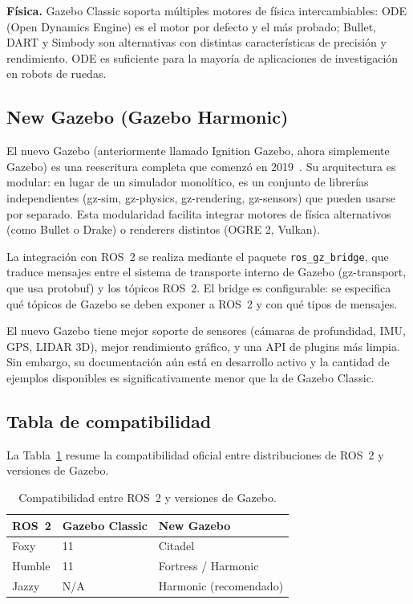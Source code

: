 \textbf{Física.} Gazebo Classic soporta múltiples motores de física intercambiables: ODE (Open Dynamics Engine) es el motor por defecto y el más probado; Bullet, DART y Simbody son alternativas con distintas características de precisión y rendimiento. ODE es suficiente para la mayoría de aplicaciones de investigación en robots de ruedas.

\subsection{New Gazebo (Gazebo Harmonic)}

El nuevo Gazebo (anteriormente llamado Ignition Gazebo, ahora simplemente Gazebo) es una reescritura completa que comenzó en 2019~\cite{koenig2004design}. Su arquitectura es modular: en lugar de un simulador monolítico, es un conjunto de librerías independientes (gz-sim, gz-physics, gz-rendering, gz-sensors) que pueden usarse por separado. Esta modularidad facilita integrar motores de física alternativos (como Bullet o Drake) o renderers distintos (OGRE 2, Vulkan).

La integración con ROS~2 se realiza mediante el paquete \texttt{ros\_gz\_bridge}, que traduce mensajes entre el sistema de transporte interno de Gazebo (gz-transport, que usa protobuf) y los tópicos ROS~2. El bridge es configurable: se especifica qué tópicos de Gazebo se deben exponer a ROS~2 y con qué tipos de mensajes.

El nuevo Gazebo tiene mejor soporte de sensores (cámaras de profundidad, IMU, GPS, LIDAR 3D), mejor rendimiento gráfico, y una API de plugins más limpia. Sin embargo, su documentación aún está en desarrollo activo y la cantidad de ejemplos disponibles es significativamente menor que la de Gazebo Classic.

\subsection{Tabla de compatibilidad}

La Tabla~\ref{tab:gazebo_compat} resume la compatibilidad oficial entre distribuciones de ROS~2 y versiones de Gazebo.

\begin{table}[H]
  \centering
  \caption{Compatibilidad entre ROS~2 y versiones de Gazebo.}
  \label{tab:gazebo_compat}
  \begin{tabular}{@{}lll@{}}
    \toprule
    ROS~2 & Gazebo Classic & New Gazebo \\
    \midrule
    Foxy   & 11        & Citadel \\
    Humble & 11        & Fortress / Harmonic \\
    Jazzy  & N/A       & Harmonic (recomendado) \\
    \bottomrule
  \end{tabular}
\end{table}

